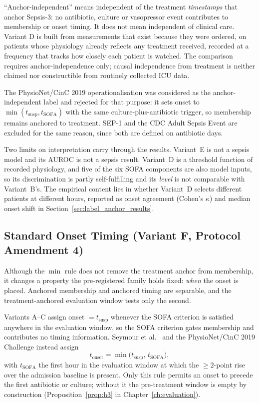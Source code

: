 ``Anchor-independent'' means independent of the treatment \emph{timestamps}
that anchor Sepsis-3: no antibiotic, culture or vasopressor event contributes
to membership or onset timing. It does not mean independent of clinical care.
Variant D is built from measurements that exist because they were ordered, on
patients whose physiology already reflects any treatment received, recorded at
a frequency that tracks how closely each patient is watched. The comparison
requires anchor-independence only; causal independence from treatment is
neither claimed nor constructible from routinely collected ICU data.

The PhysioNet/CinC 2019 operationalisation \cite{reyna2020utility} was
considered as the anchor-independent label and rejected for that purpose: it
sets onset to $\min(t_{\text{susp}}, t_{\text{SOFA}})$ with the same
culture-plus-antibiotic trigger, so membership remains anchored to treatment.
SEP-1 and the CDC Adult Sepsis Event \cite{dutta2026performance} are excluded
for the same reason, since both are defined on antibiotic days.

Two limits on interpretation carry through the results. Variant~E is not a
sepsis model and its AUROC is not a sepsis result. Variant~D is a threshold
function of recorded physiology, and five of the six SOFA components are also
model inputs, so its discrimination is partly self-fulfilling and its
\emph{level} is not comparable with Variant~B's. The empirical content lies in
whether Variant~D selects different patients at different hours, reported as
onset agreement (Cohen's $\kappa$) and median onset shift in
Section~\ref{sec:label_anchor_results}.

\subsection{Standard Onset Timing (Variant F, Protocol Amendment 4)}
\label{sec:variant_f}

Although the $\min$ rule does not remove the treatment anchor from membership,
it changes a property the pre-registered family holds fixed: \emph{when} the
onset is placed. Anchored membership and anchored timing are separable, and the
treatment-anchored evaluation window tests only the second.

Variants A--C assign onset $= t_{\text{susp}}$ whenever the SOFA criterion is
satisfied anywhere in the evaluation window, so the SOFA criterion gates
membership and contributes no timing information. Seymour et al.\
\cite{seymour2016assessment} and the PhysioNet/CinC 2019 Challenge
\cite{reyna2020utility} instead assign
\begin{equation}
    t_{\text{onset}} = \min\bigl(t_{\text{susp}},\, t_{\text{SOFA}}\bigr),
    \label{eq:early_onset}
\end{equation}
with $t_{\text{SOFA}}$ the first hour in the evaluation window at which the
$\geq 2$-point rise over the admission baseline is present. Only this rule
permits an onset to precede the first antibiotic or culture; without it the
pre-treatment window is empty by construction (Proposition~\ref{prop:h3} in
Chapter~\ref{ch:evaluation}).

